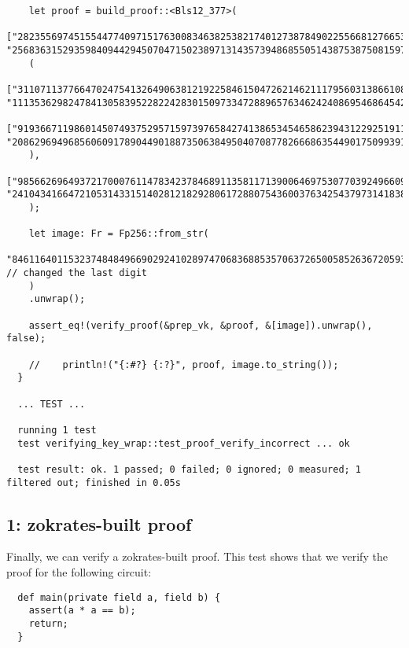 \documentclass{article}
\begin{document}
\begin{lstlisting}
    let proof = build_proof::<Bls12_377>(
    ["2823556974515544774097151763008346382538217401273878490225566812766536738796196154138387932214916091703926798612", "256836315293598409442945070471502389713143573948685505143875387508159714195596227342715425692593966353228874272253"],
    (
    ["31107113776647024754132649063812192258461504726214621117956031386610890802548704229846887183629711420377939432119", "111353629824784130583952282242830150973347288965763462424086954686454292967282100836332310927094987906314221421873"],
    ["91936671198601450749375295715973976584274138653454658623943122925191168704925205918404144895071632258580325591842", "208629694968560609178904490188735063849504070877826668635449017509939169002653787652914605885048807640820436312893"]
    ),
    ["98566269649372170007611478342378468911358117139006469753077039249660968858754944774214496198826225135709632991983", "241043416647210531433151402812182928061728807543600376342543797314183884387241527972417219291397635999358690899902"]
    );

    let image: Fr = Fp256::from_str(
    "846116401153237484849669029241028974706836885357063726500585263672059318072", // changed the last digit
    )
    .unwrap();

    assert_eq!(verify_proof(&prep_vk, &proof, &[image]).unwrap(), false);

    //    println!("{:#?} {:?}", proof, image.to_string());
  }

  ... TEST ...

  running 1 test
  test verifying_key_wrap::test_proof_verify_incorrect ... ok

  test result: ok. 1 passed; 0 failed; 0 ignored; 0 measured; 1 filtered out; finished in 0.05s

\end{lstlisting}

\subsection{1: zokrates-built proof}
Finally, we can verify a zokrates-built proof. This test shows that we verify the proof for the following circuit:

\begin{lstlisting}
  def main(private field a, field b) {
    assert(a * a == b);
    return;
  }
\end{lstlisting}
\end{document}
